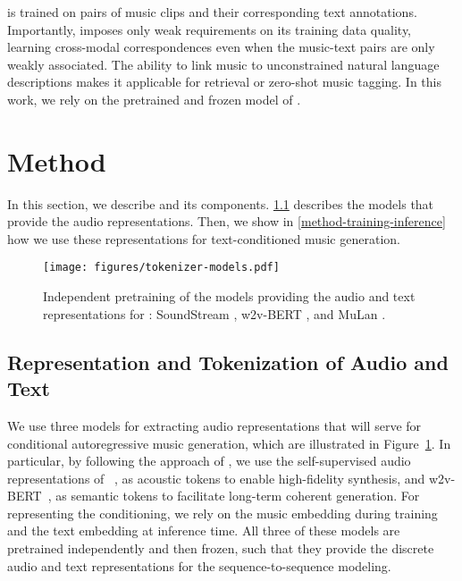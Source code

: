 {\mulan} is trained on pairs of music clips and their corresponding text annotations. Importantly, {\mulan} imposes only weak requirements on its training data quality, learning  cross-modal correspondences even when the music-text pairs are only weakly associated.
The ability to link music to unconstrained natural language descriptions makes it applicable for retrieval or zero-shot music tagging. In this work, we rely on the pretrained and frozen model of \citet{mulan}.
\section{Method}
\label{sec:method}

In this section, we describe {\model} and its components. \cref{sec:audio-representation} describes the models that provide the audio representations. Then, we show in \cref{method-training-inference} how we use these representations for text-conditioned music generation.

\begin{figure}[t]
\begin{center}
\centerline{\texttt{[image: figures/tokenizer-models.pdf]}}
\caption{Independent pretraining of the models providing the audio and text representations for {\model}: SoundStream \cite{soundstream}, w2v-BERT \cite{wav2vec-bert}, and MuLan \cite{mulan}.}
\label{fig:models-pretraining}
\end{center}
\end{figure}
\vspace{-4mm}

\subsection{Representation and Tokenization of Audio and Text} \label{sec:audio-representation}
We use three models for extracting audio representations that will serve for conditional autoregressive music generation, which are illustrated in Figure~\ref{fig:models-pretraining}. In particular, by following the approach of {\audiolm}, we use the self-supervised audio representations of {\soundstream}~\citep{soundstream}, as acoustic tokens to enable high-fidelity synthesis, and w2v-BERT~\citep{wav2vec-bert}, as semantic tokens to facilitate long-term coherent generation. For representing the conditioning, we rely on the {\mulan} music embedding during training and the {\mulan} text embedding at inference time. All three of these models are pretrained independently and then frozen, such that they provide the discrete audio and text representations for the sequence-to-sequence modeling.

